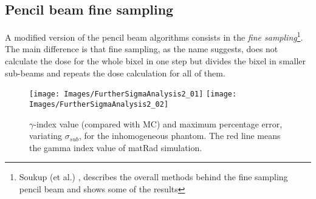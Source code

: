 \documentclass[12pt, a4paper, twoside]{book}
\begin{document}
\subsection{Pencil beam fine sampling}\label{FS}
A modified version of the pencil beam algorithms consists in the \emph{fine sampling}\footnote{Soukup (et al.) \cite{souk:pba}, describes the overall methods behind the fine sampling pencil beam and shows some of the results}.
The main difference is that fine sampling, as the name suggests, does not calculate the dose for the whole bixel in one step but divides the bixel in smaller sub-beams and repeats the dose calculation for all of them. 
\begin{figure}[t]
{\texttt{[image: Images/FurtherSigmaAnalysis2\_01]}}
{\texttt{[image: Images/FurtherSigmaAnalysis2\_02]}}
\caption{$\gamma$-index value (compared with MC) and maximum percentage error, variating $\sigma_{sub}$, for the inhomogeneous phantom. The red line means the gamma index value of matRad simulation.}
\label{fig:sigsub}
\end{figure}
\end{document}
